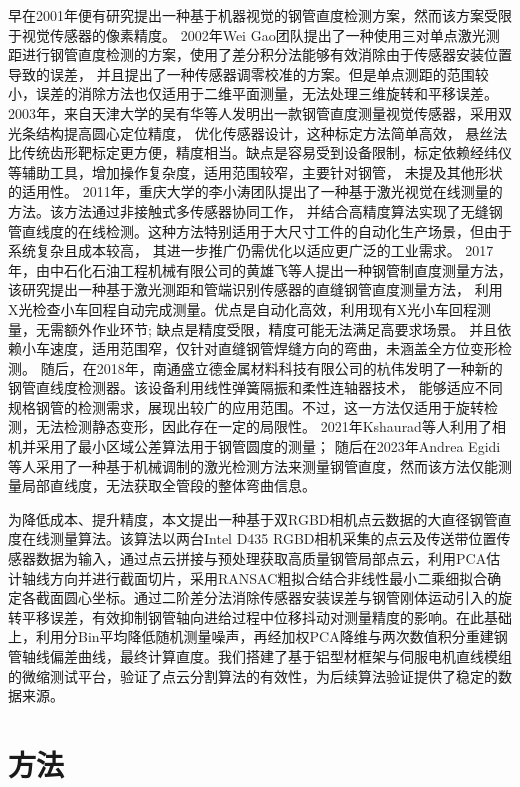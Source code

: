 \documentclass{article}
\let\oldcite\cite
\renewcommand{\cite}[1]{\oldcite{#1}}
\begin{document}
早在2001年便有研究提出一种基于机器视觉的钢管直度检测方案\cite{cv}，然而该方案受限于视觉传感器的像素精度。
2002年Wei Gao团队提出了一种使用三对单点激光测距进行钢管直度检测的方案，使用了差分积分法能够有效消除由于传感器安装位置导致的误差，
并且提出了一种传感器调零校准的方案\cite{pm}。但是单点测距的范围较小，误差的消除方法也仅适用于二维平面测量，无法处理三维旋转和平移误差。 
2003年，来自天津大学的吴有华等人发明出一款钢管直度测量视觉传感器，采用双光条结构提高圆心定位精度， 优化传感器设计，这种标定方法简单高效，
悬丝法比传统齿形靶标定更方便，精度相当。缺点是容易受到设备限制，标定依赖经纬仪等辅助工具，增加操作复杂度，适用范围较窄，主要针对钢管，
未提及其他形状的适用性。  
2011年，重庆大学的李小涛团队提出了一种基于激光视觉在线测量的方法。该方法通过非接触式多传感器协同工作，
并结合高精度算法实现了无缝钢管直线度的在线检测。这种方法特别适用于大尺寸工件的自动化生产场景，但由于系统复杂且成本较高，
其进一步推广仍需优化以适应更广泛的工业需求。
2017年，由中石化石油工程机械有限公司的黄雄飞等人提出一种钢管制直度测量方法，该研究提出一种基于激光测距和管端识别传感器的直缝钢管直度测量方法，
利用X光检查小车回程自动完成测量。优点是自动化高效，利用现有X光小车回程测量，无需额外作业环节\cite{hxf}; 缺点是精度受限，精度可能无法满足高要求场景。
并且依赖小车速度，适用范围窄，仅针对直缝钢管焊缝方向的弯曲，未涵盖全方位变形检测。
随后，在2018年，南通盛立德金属材料科技有限公司的杭伟发明了一种新的钢管直线度检测器。该设备利用线性弹簧隔振和柔性连轴器技术，
能够适应不同规格钢管的检测需求，展现出较广的应用范围。不过，这一方法仅适用于旋转检测，无法检测静态变形，因此存在一定的局限性。
2021年Kshaurad等人利用了相机并采用了最小区域公差算法用于钢管圆度的测量\cite{cv_yd}；
随后在2023年Andrea Egidi等人采用了一种基于机械调制的激光检测方法来测量钢管直度\cite{tzzxd}，然而该方法仅能测量局部直线度，无法获取全管段的整体弯曲信息。


为降低成本、提升精度，本文提出一种基于双RGBD相机点云数据的大直径钢管直度在线测量算法。该算法以两台Intel D435 RGBD相机采集的点云及传送带位置传感器数据为输入，通过点云拼接与预处理获取高质量钢管局部点云，利用PCA估计轴线方向并进行截面切片，采用RANSAC粗拟合结合非线性最小二乘细拟合确定各截面圆心坐标。通过二阶差分法消除传感器安装误差与钢管刚体运动引入的旋转平移误差，有效抑制钢管轴向进给过程中位移抖动对测量精度的影响。在此基础上，利用分Bin平均降低随机测量噪声，再经加权PCA降维与两次数值积分重建钢管轴线偏差曲线，最终计算直度。我们搭建了基于铝型材框架与伺服电机直线模组的微缩测试平台，验证了点云分割算法的有效性，为后续算法验证提供了稳定的数据来源。

\section{方法}
\end{document}
